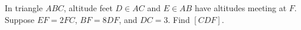 In triangle $ ABC $, altitude feet $ D\in AC $ and $ E\in AB $ have altitudes meeting at $ F $. Suppose $ EF=2FC $, $ BF=8DF $, and $ DC=3 $. Find $[CDF]$.
